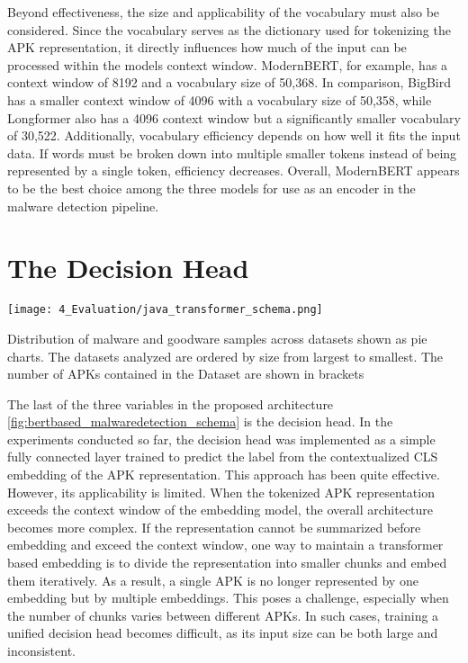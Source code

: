 Beyond effectiveness, the size and applicability of the vocabulary must also be considered.
Since the vocabulary serves as the dictionary used for tokenizing the APK representation, 
it directly influences how much of the input can be processed within the models context window.
ModernBERT, for example, has a context window of 8192 and a vocabulary size of 50,368.
In comparison, BigBird has a smaller context window of 4096 with a vocabulary size of 50,358, 
while Longformer also has a 4096 context window but a significantly smaller vocabulary of 30,522.
Additionally, vocabulary efficiency depends on how well it fits the input data.
If words must be broken down into multiple smaller tokens instead of being represented by a single token, efficiency decreases.
Overall, ModernBERT appears to be the best choice among the three models for use as an encoder in the malware detection pipeline.

\section{The Decision Head}
\label{sec:decision_head}

\begin{marginfigure}[-3\baselineskip] %
    \center
    \texttt{[image: 4\_Evaluation/java\_transformer\_schema.png]}
    \caption{\label{fig:java_transformer_schema}
    Distribution of malware and goodware samples across datasets shown as pie charts.
    The datasets analyzed are ordered by size from largest to smallest.
    The number of APKs contained in the Dataset are shown in brackets}
\end{marginfigure}

The last of the three variables in the proposed architecture \ref{fig:bertbased_malwaredetection_schema} is the decision head.
In the experiments conducted so far, the decision head was implemented as a simple fully connected layer 
trained to predict the label from the contextualized CLS embedding of the APK representation.
This approach has been quite effective. However, its applicability is limited.
When the tokenized APK representation exceeds the context window of the embedding model, 
the overall architecture becomes more complex.
If the representation cannot be summarized before embedding and exceed the context window, 
one way to maintain a transformer based embedding is to 
divide the representation into smaller chunks and embed them iteratively.
As a result, a single APK is no longer represented by one embedding but by multiple embeddings.
This poses a challenge, especially when the number of chunks varies between different APKs.
In such cases, training a unified decision head becomes difficult, as its input size can be 
both large and inconsistent.

